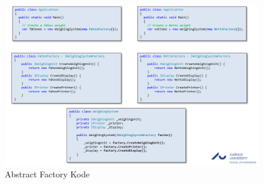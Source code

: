 \documentclass[../report.tex]{subfiles}
\begin{document}
\begin{figure}[H]
    \centering
    \includegraphics[width = \textwidth]{pics/abstract_factory_code.PNG}
    \caption{Abstract Factory Kode}
    \label{fig:abstract_factory_code}
\end{figure}
\end{document}
